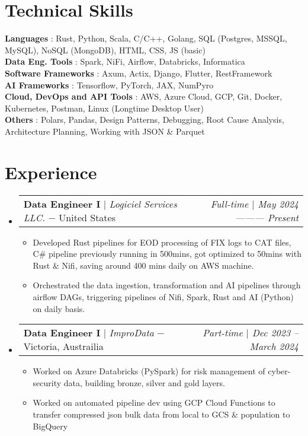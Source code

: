 \documentclass[letterpaper,10pt]{article}
\makeatletter
\newcommand{\sectionspace}{
\vspace{-20pt}
}
\newcommand{\subheadingtitlevspace}{
\vspace{-3pt}
}
\newcommand{\resumeItem}[1]{
  \item{
    {#1 \vspace{-4pt}}
  }
}
\newcommand{\titleItem}[1]{
  \textbf{#1}
}
\newcommand{\resumeProjectHeading}[2]{
    \item
    \begin{tabular*}{0.97\textwidth}{l@{\extracolsep{\fill}}r}
      #1 & \textit{ #2} \\
    \end{tabular*}\vspace{-9pt}
}
\newcommand{\resumeSubHeadingListStart}{\subheadingtitlevspace\begin{itemize}[leftmargin=0.15in, label={}]}
\newcommand{\resumeSubHeadingListEnd}{\end{itemize}}
\newcommand{\resumeItemListStart}{
\begin{itemize}}
\newcommand{\resumeItemListEnd}{
\end{itemize}\vspace{-8pt}}
\makeatother
\begin{document}
\section{Technical Skills}
\subheadingtitlevspace
\begin{itemize}[leftmargin=0.15in, label={}]
	{\item{
          \titleItem{Languages}{: Rust, Python, Scala, C/C++, Golang, SQL (Postgres, MSSQL,
          MySQL), NoSQL (MongoDB), HTML, CSS, JS (basic)} \\
          \titleItem{Data Eng. Tools}{: Spark, NiFi, Airflow, Databricks, Informatica}\\
          \titleItem{Software Frameworks}{: Axum, Actix, Django, Flutter, RestFramework}\\
          \titleItem{AI Frameworks}{: Tensorflow, PyTorch, JAX, NumPyro}\\
          \titleItem{Cloud, DevOps and API Tools}{: AWS, Azure Cloud, GCP, Git,
          Docker, Kubernetes, Postman, Linux (Longtime Desktop User)} \\
          \titleItem{Others}{: Polars, Pandas, Design Patterns, Debugging, Root
          Cause Analysis, Architecture Planning, Working with JSON \& Parquet}
	}}
\end{itemize}
\sectionspace





\section{Experience}
\resumeSubHeadingListStart
\resumeProjectHeading
{\titleItem{{Data Engineer I}} $|$ \emph{Logiciel Services LLC.} $-$ \small{United States}}{\small{Full-time} $|$ May 2024 --------- Present}
\resumeItemListStart
\resumeItem{Developed Rust pipelines for EOD processing of FIX logs to CAT
files, C\# pipeline previously running in 500mins, got optimized to 50mins with
Rust \& Nifi, saving around 400 mins daily on AWS machine.} 
\resumeItem{Orchestrated the data ingestion, transformation and AI pipelines
through airflow DAGs, triggering pipelines of Nifi, Spark, Rust and AI (Python)
on daily basis.}
\resumeItemListEnd
\resumeSubHeadingListEnd


\resumeSubHeadingListStart
\resumeProjectHeading
{\titleItem{{Data Engineer I}} $|$ \emph{ImproData} $-$ \small{Victoria, Austrailia}}{ \small{Part-time} $|$ Dec 2023 -- March 2024 }
\resumeItemListStart
\resumeItem{Worked on Azure Databricks (PySpark) for risk management of
cyber-security data, building bronze, silver and gold layers.}
\resumeItem{Worked on automated pipeline dev using GCP Cloud Functions to
transfer compressed json bulk data from local to GCS \& population to BigQuery}
\resumeItemListEnd
\resumeSubHeadingListEnd
\end{document}
